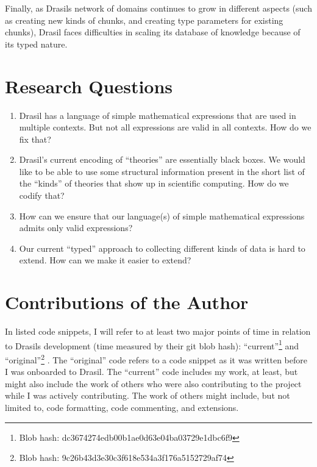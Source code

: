 Finally, as Drasils network of domains continues to grow in different aspects
(such as creating new kinds of chunks, and creating type parameters for existing
chunks), Drasil faces difficulties in scaling its database of knowledge because
of its typed nature.

\section{Research Questions}
\label{sec:intro:researchquestions}

\begin{enumerate}

      \item[\namedlabel{rq:lang_division}{RQ1}] Drasil has a language of simple
            mathematical expressions that are used in multiple contexts. But not
            all expressions are valid in all contexts. How do we fix that?

      \item[\namedlabel{rq:modelkinds}{RQ2}] Drasil's current encoding of
            ``theories'' are essentially black boxes. We would like to be able
            to use some structural information present in the short list of the
            ``kinds'' of theories that show up in scientific computing. How do
            we codify that?

      \item[\namedlabel{rq:typing}{RQ3}] How can we ensure that our language(s)
            of simple mathematical expressions admits only valid expressions?

      \item[\namedlabel{rq:chunkdb}{RQ4}] Our current ``typed'' approach to
            collecting different kinds of data is hard to extend. How can we
            make it easier to extend?

\end{enumerate}

\section{Contributions of the Author}
\label{sec:intro:contributions}

In listed code snippets, I will refer to at least two major points of time in
relation to Drasils development (time measured by their git blob hash):
``current''\footnote{Blob hash: dc3674274edb00b1ae0d63e04ba03729e1dbc6f9} and
``original''\footnote{Blob hash: 9c26b43d3e30c3f618e534a3f176a5152729af74}
. The ``original'' code refers
to a code snippet as it was written before I was onboarded to Drasil. The
``current'' code includes my work, at least, but might also include the work of
others who were also contributing to the project while I was actively
contributing. The work of others might include, but not limited to, code
formatting, code commenting, and extensions.

